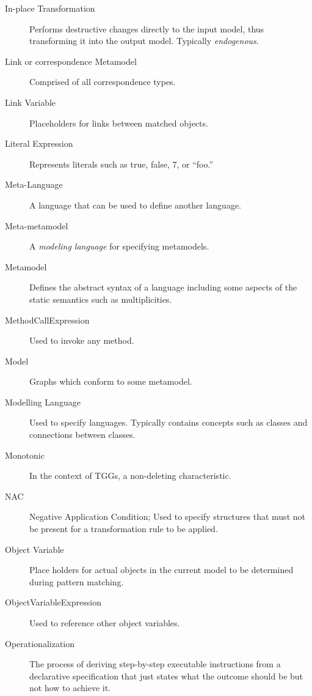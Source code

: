 \begin{description}
\item[In-place Transformation] 
Performs destructive changes directly to the input model, thus transforming it into the output model. Typically \emph{endogenous}.

\item[Link or correspondence Metamodel] %
Comprised of all correspondence types.

\item[Link Variable] %
Placeholders for links between matched objects.

\item[Literal Expression] %
Represents literals such as true, false, 7, or ``foo.''

\item[Meta-Language] %
A language that can be used to define another language.

\item[Meta-metamodel] %
A \emph{modeling language} for specifying metamodels.

\item[Metamodel] %
Defines the abstract syntax of a language including some aspects of the static semantics such as multiplicities. 

\item[MethodCallExpression] %
Used to invoke any method.

\item[Model] %
Graphs which conform to some metamodel.

\item[Modelling Language] %
Used to specify languages. Typically contains concepts such as classes and connections between classes.

\item[Monotonic] %
In the context of TGGs, a non-deleting characteristic.

\item[NAC] %
Negative Application Condition; Used to specify structures that must not be present for a transformation rule to be applied.

\item[Object Variable] %
Place holders for actual objects in the current model to be determined during pattern matching.

\item[ObjectVariableExpression] %
Used to reference other object variables.

\item[Operationalization] %
The process of deriving step-by-step executable instructions from a declarative specification that just states what the outcome should
be but not how to achieve it.


\end{description}
